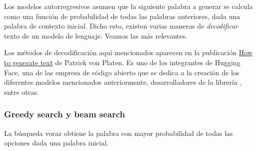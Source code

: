 Los modelos autorregresivos asumen que la siguiente palabra a generar se calcula como una función de probabilidad de todas las palabras anteriores, dada una palabra de contexto inicial. Dicho esto, existen varias maneras de \textit{decodificar} texto de un modelo de lenguaje. Veamos las más relevantes.

Los métodos de decodificación aquí mencionados aparecen en la publicación \href{https://huggingface.co/blog/how-to-generate}{How to generate text} de Patrick von Platen. Es uno de los integrantes de Hugging Face, una de las empresa de código abierto que se dedica a la creación de los diferentes modelos mencionados anteriormente, desarrolladores de la librería , entre otras.

\subsubsection{Greedy search y beam search}
La búsqueda voraz obtiene la palabra con mayor probabilidad de todas las opciones dada una palabra inicial. 


